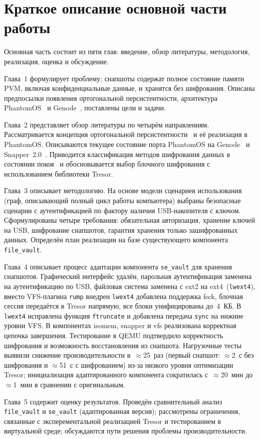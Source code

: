 \chapter{Краткое описание основной части работы}

Основная часть состоит из пяти глав: введение, обзор литературы, методология, реализация, оценка и обсуждение.

Глава~1 формулирует проблему: снапшоты содержат полное состояние памяти PVM, включая конфиденциальные данные, и хранятся без шифрования. Описаны предпосылки появления ортогональной персистентности, архитектура PhantomOS~\cite{Phantom_docs} и Genode~\cite{Genode_Foundations}, поставлены цели и задачи.

Глава~2 представляет обзор литературы по четырём направлениям. Рассматривается концепция ортогональной персистентности~\cite{PLA,Revisited,KOS,Aurora} и её реализация в PhantomOS. Описываются текущее состояние порта PhantomOS на Genode~\cite{Antonov_Anton} и Snapper~2.0~\cite{FOSDEM_Snapper,FOSDEM_Snapper_paper}. Приводится классификация методов шифрования данных в состоянии покоя~\cite{NIST_SP800111,CryptoFS} и обосновывается выбор блочного шифрования с использованием библиотеки Tresor.

Глава~3 описывает методологию. На основе модели сценариев использования (граф, описывающий полный цикл работы компьютера) выбраны безопасные сценарии с аутентификацией по фактору наличия USB-накопителя с ключом. Сформулированы четыре требования: обязательная авторизация, хранение ключей на USB, шифрование снапшотов, гарантия хранения только зашифрованных данных. Определён план реализации на базе существующего компонента \texttt{file\_vault}.

Глава~4 описывает процесс адаптации компонента \texttt{se\_vault} для хранения снапшотов. Графический интерфейс удалён, парольная аутентификация заменена на аутентификацию по USB, файловая система заменена с ext2 на ext4~(\texttt{lwext4}), вместо VFS-плагина \texttt{rump} внедрен \texttt{lwext4} добавлена поддержка fsck, блочная сессия передаётся в Tresor напрямую, все блоки унифицированы до~4~КБ. В \texttt{lwext4} исправлена функция \texttt{ftruncate} и добавлена передача \texttt{sync} на нижние уровни VFS. В компонентах isomem, snapper и vfs реализована корректная цепочка завершения. Тестирование в QEMU подтвердило корректность шифрования и возможность восстановления из снапшота. Нагрузочные тесты выявили снижение производительности в~$\approx$25~раз (первый снапшот: $\approx$2~с без шифрования и $\approx$51~с с шифрованием) из-за низкого уровня оптимизации Tresor; инициализация адаптированного компонента сократилась с~$\approx$20~мин до~$\approx$1~мин в сравнении с оригинальным.

Глава~5 содержит оценку результатов. Проведён сравнительный анализ \texttt{file\_vault} и \texttt{se\_vault} (адаптированная версия); рассмотрены ограничения, связанные с эксперементальной реализацией Tresor и тестированием в виртуальной среде; обсуждаются пути решения проблемы производительности.

